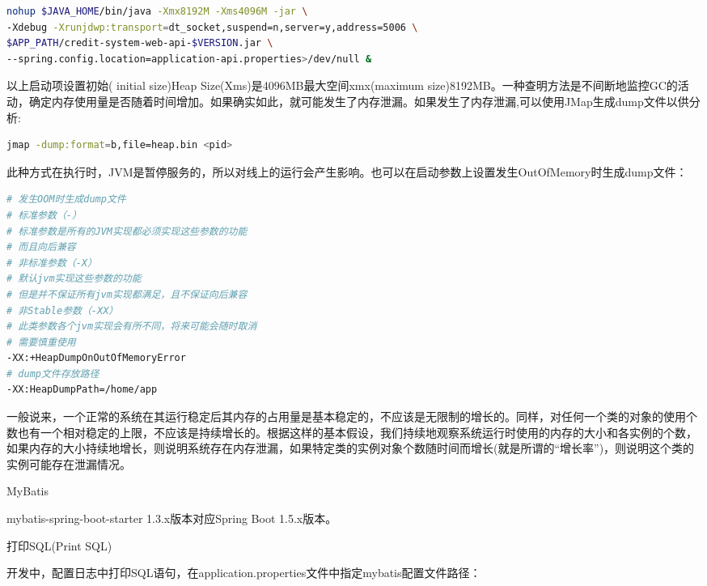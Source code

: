 \documentclass[12pt]{book}
\makeatletter
\numberwithin{dummy}{section}
\theoremstyle{ocrenumbox}
\theoremstyle{blacknumex}
\theoremstyle{blacknumbox}
\theoremstyle{ocrenum}
\renewcommand{\section}{\@startsection{section}{1}{\z@}
	{-4ex \@plus -1ex \@minus -.4ex}
	{1ex \@plus.2ex }
	{\normalfont\large\sffamily\bfseries}}
\renewcommand{\subsection}{\@startsection {subsection}{2}{\z@}
	{-3ex \@plus -0.1ex \@minus -.4ex}
	{0.5ex \@plus.2ex }
	{\normalfont\sffamily\bfseries}}
\makeatother
\begin{document}
\begin{lstlisting}[language=Bash]
nohup $JAVA_HOME/bin/java -Xmx8192M -Xms4096M -jar \
-Xdebug -Xrunjdwp:transport=dt_socket,suspend=n,server=y,address=5006 \
$APP_PATH/credit-system-web-api-$VERSION.jar \
--spring.config.location=application-api.properties>/dev/null &
\end{lstlisting}

以上启动项设置初始( initial size)Heap Size(Xms)是4096MB最大空间xmx(maximum size)8192MB。一种查明方法是不间断地监控GC的活动，确定内存使用量是否随着时间增加。如果确实如此，就可能发生了内存泄漏。如果发生了内存泄漏,可以使用JMap生成dump文件以供分析:

\begin{lstlisting}[language=Bash]
jmap -dump:format=b,file=heap.bin <pid> 
\end{lstlisting}

此种方式在执行时，JVM是暂停服务的，所以对线上的运行会产生影响。也可以在启动参数上设置发生OutOfMemory时生成dump文件：

\begin{lstlisting}[language=Bash]
# 发生OOM时生成dump文件
# 标准参数（-）
# 标准参数是所有的JVM实现都必须实现这些参数的功能
# 而且向后兼容
# 非标准参数（-X）
# 默认jvm实现这些参数的功能
# 但是并不保证所有jvm实现都满足，且不保证向后兼容
# 非Stable参数（-XX）
# 此类参数各个jvm实现会有所不同，将来可能会随时取消
# 需要慎重使用
-XX:+HeapDumpOnOutOfMemoryError
# dump文件存放路径
-XX:HeapDumpPath=/home/app
\end{lstlisting}

一般说来，一个正常的系统在其运行稳定后其内存的占用量是基本稳定的，不应该是无限制的增长的。同样，对任何一个类的对象的使用个数也有一个相对稳定的上限，不应该是持续增长的。根据这样的基本假设，我们持续地观察系统运行时使用的内存的大小和各实例的个数，如果内存的大小持续地增长，则说明系统存在内存泄漏，如果特定类的实例对象个数随时间而增长(就是所谓的“增长率”)，则说明这个类的实例可能存在泄漏情况。

\section{MyBatis}

mybatis-spring-boot-starter 1.3.x版本对应Spring Boot 1.5.x版本。


\subsection{打印SQL(Print SQL)}

开发中，配置日志中打印SQL语句，在application.properties文件中指定mybatis配置文件路径：
\end{document}
